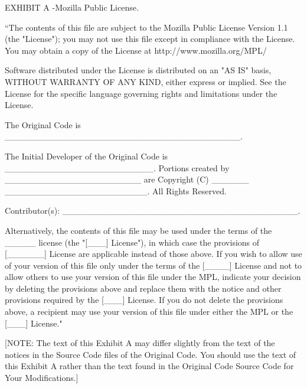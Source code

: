 E\-X\-H\-I\-B\-I\-T A -\/\-Mozilla Public License. \begin{DoxyVerb} ``The contents of this file are subject to the Mozilla Public License
 Version 1.1 (the "License"); you may not use this file except in
 compliance with the License. You may obtain a copy of the License at
 http://www.mozilla.org/MPL/

 Software distributed under the License is distributed on an "AS IS"
 basis, WITHOUT WARRANTY OF ANY KIND, either express or implied. See the
 License for the specific language governing rights and limitations
 under the License.

 The Original Code is ______________________________________.

 The Initial Developer of the Original Code is ________________________.
 Portions created by ______________________ are Copyright (C) ______
 _______________________. All Rights Reserved.

 Contributor(s): ______________________________________.

 Alternatively, the contents of this file may be used under the terms
 of the _____ license (the  "[___] License"), in which case the
 provisions of [______] License are applicable instead of those
 above.  If you wish to allow use of your version of this file only
 under the terms of the [____] License and not to allow others to use
 your version of this file under the MPL, indicate your decision by
 deleting  the provisions above and replace  them with the notice and
 other provisions required by the [___] License.  If you do not delete
 the provisions above, a recipient may use your version of this file
 under either the MPL or the [___] License."

 [NOTE: The text of this Exhibit A may differ slightly from the text of
 the notices in the Source Code files of the Original Code. You should
 use the text of this Exhibit A rather than the text found in the
 Original Code Source Code for Your Modifications.]\end{DoxyVerb}
 